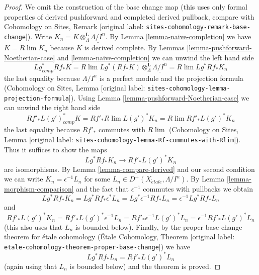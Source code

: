\documentclass[10pt,a4paper]{article}
\theoremstyle{plain}
\theoremstyle{definition}
\theoremstyle{remark}
\numberwithin{equation}{subsection}
\def\lim{\mathop{\mathrm{lim}}\nolimits}
\def\etale{{\acute{e}tale}}
\begin{document}
\begin{proof}
We omit the construction of the base change map (this uses only
formal properties of derived pushforward and completed derived pullback,
compare with
Cohomology on Sites, Remark [original label: \nolinkurl{sites-cohomology-remark-base-change}]).
Write $K_n = K \otimes^\mathbf{L}_\Lambda \underline{\Lambda/I^n}$.
By Lemma \ref{lemma-naive-completion} we have $K = R\lim K_n$
because $K$ is derived complete.
By Lemmas \ref{lemma-pushforward-Noetherian-case} and
\ref{lemma-naive-completion} we can unwind the left hand side
$$
Lg_{comp}^* Rf_* K =
R\lim Lg^*(Rf_*K)\otimes^\mathbf{L}_\Lambda \underline{\Lambda/I^n} =
R\lim Lg^* Rf_* K_n
$$
the last equality because $\Lambda/I^n$ is a perfect module and
the projection formula (Cohomology on Sites, Lemma
[original label: \nolinkurl{sites-cohomology-lemma-projection-formula}]).
Using Lemma \ref{lemma-pushforward-Noetherian-case} we can unwind the right
hand side
$$
Rf'_* L(g')^*_{comp} K =
Rf'_* R\lim L(g')^* K_n  =
R\lim Rf'_* L(g')^* K_n
$$
the last equality because $Rf'_*$ commutes with $R\lim$
(Cohomology on Sites, Lemma
[original label: \nolinkurl{sites-cohomology-lemma-Rf-commutes-with-Rlim}]).
Thus it suffices to show the maps
$$
Lg^* Rf_* K_n \longrightarrow Rf'_* L(g')^* K_n
$$
are isomorphisms. By Lemma \ref{lemma-compare-derived} and our second
condition we can write $K_n = \epsilon^{-1}L_n$ for some
$L_n \in D^+(X_\etale, \Lambda/I^n)$. By Lemma \ref{lemma-morphism-comparison}
and the fact that $\epsilon^{-1}$ commutes with pullbacks
we obtain
$$
Lg^* Rf_* K_n =
Lg^* Rf_* \epsilon^*L_n =
Lg^* \epsilon^{-1} Rf_* L_n =
\epsilon^{-1} Lg^* Rf_* L_n
$$
and
$$
Rf'_* L(g')^* K_n =
Rf'_* L(g')^* \epsilon^{-1} L_n =
Rf'_* \epsilon^{-1} L(g')^* L_n =
\epsilon^{-1} Rf'_* L(g')^* L_n
$$
(this also uses that $L_n$ is bounded below).
Finally, by the proper base change theorem for \'etale cohomology
(\'Etale Cohomology, Theorem
[original label: \nolinkurl{etale-cohomology-theorem-proper-base-change}]) we have
$$
Lg^* Rf_* L_n = Rf'_* L(g')^* L_n
$$
(again using that $L_n$ is bounded below)
and the theorem is proved.
\end{proof}










\end{document}
